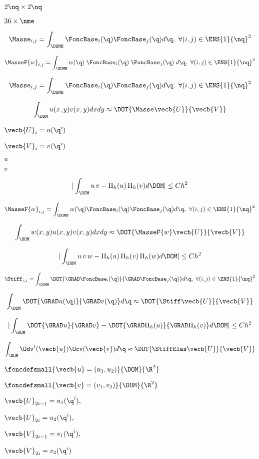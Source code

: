 \documentclass{article}
\begin{document}
$2\nq\times 2\nq$
\pagebreak

$36\times \nme$
\pagebreak

\[\Masse_{i,j}=\int_\DOMH \FoncBase_i(\q) \FoncBase_j(\q) d\q,\ \forall (i,j)\in{\ENS{1}{\nq}}^2\]
\pagebreak

\[\MasseF{w}_{i,j}=\int_\DOMH w(\q)\;\FoncBase_i(\q)\; \FoncBase_j(\q)\; d\q,\ \forall (i,j)\in{\ENS{1}{\nq}}^2\]
\pagebreak

\[\Masse_{i,j}=\int_\DOMH \FoncBase_i(\q) \FoncBase_j(\q) d\q,\ \forall (i,j)\in\ENS{1}{\nq}^2\]
\pagebreak

\[\int_\DOM u(x,y) v(x,y) dxdy \approx \DOT{\Masse \vecb{U}}{\vecb{V}}\]
\pagebreak

$\vecb{U}_i=u(\q^i)$
\pagebreak

$\vecb{V}_i=v(\q^i)$
\pagebreak

$u$
\pagebreak

$v$
\pagebreak

\[|\int_\DOM u\,v -\Pi_h(u)\,\Pi_h(v)d\DOM| \leq C h^2\]
\pagebreak

\[\MasseF{w}_{i,j}=\int_\DOMH w(\q)\FoncBase_i(\q) \FoncBase_j(\q) d\q,\ \forall (i,j)\in\ENS{1}{\nq}^2\]
\pagebreak

\[\int_\DOM w(x,y) u(x,y) v(x,y) dxdy \approx \DOT{\MasseF{w} \vecb{U}}{\vecb{V}}\]
\pagebreak

\[|\int_\DOM u\,v\,w -\Pi_h(u)\,\Pi_h(v)\,\Pi_h(w)d\DOM| \leq C h^2\]
\pagebreak

\[\Stiff_{i,j}=\int_\DOMH \DOT{\GRAD\FoncBase_i(\q)}{\GRAD\FoncBase_j(\q)}d\q,\ \forall (i,j)\in\ENS{1}{\nq}^2\]
\pagebreak

\[\int_\DOM \DOT{\GRAD u(\q)}{\GRAD v(\q)}d\q \approx \DOT{\Stiff \vecb{U}}{\vecb{V}}\]
\pagebreak

\[|\int_\DOM \DOT{\GRAD u}{\GRAD v} -\DOT{\GRAD \Pi_h(u)}{\GRAD \Pi_h(v)}d\DOM| \leq C h^2\]
\pagebreak

\[\int_\DOM \Odv^t(\vecb{u}) \Ocv(\vecb{v})d\q \approx \DOT{\StiffElas \vecb{U}}{\vecb{V}}\]
\pagebreak

$\foncdefsmall{\vecb{u}=(u_1,u_2)}{\DOM}{\R^2}$
\pagebreak

$\foncdefsmall{\vecb{v}=(v_1,v_2)}{\DOM}{\R^2}$
\pagebreak

$\vecb{U}_{2i-1}=u_1(\q^i),$
\pagebreak

$\vecb{U}_{2i}=u_2(\q^i),$
\pagebreak

$\vecb{V}_{2i-1}=v_1(\q^i),$
\pagebreak

$\vecb{V}_{2i}=v_2(\q^i)$
\pagebreak
\end{document}
